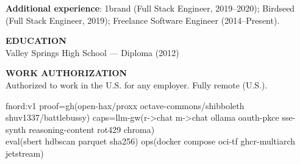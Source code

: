 \documentclass[10pt]{article}
\begin{document}
\textbf{Additional experience}: 1brand (Full Stack Engineer, 2019--2020); Birdseed (Full Stack Engineer, 2019); Freelance Software Engineer (2014--Present).

\vspace{6pt}
\textbf{EDUCATION}\\
Valley Springs High School --- Diploma (2012)

\vspace{2pt}
\textbf{WORK AUTHORIZATION}\\
Authorized to work in the U.S. for any employer. Fully remote (U.S.).

\vspace{4pt}
{\scriptsize\ttfamily
fnord:v1\; proof=gh(open-hax/proxx octave-commons/shibboleth shuv1337/battlebussy)\; caps=llm-gw(r->chat m->chat ollama oauth-pkce sse-synth reasoning-content rot429 chroma)\\
eval(sbert hdbscan parquet sha256)\; ops(docker compose oci-tf ghcr-multiarch jetstream)
}
\end{document}
